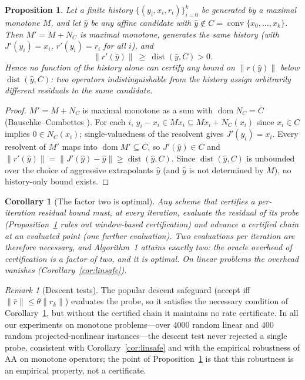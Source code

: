 \documentclass[11pt]{article}
\newtheorem{proposition}[theorem]{Proposition}
\newtheorem{corollary}[theorem]{Corollary}
\theoremstyle{definition}
\theoremstyle{remark}
\newtheorem{remark}[theorem]{Remark}
\DeclareMathOperator{\dom}{dom}
\DeclareMathOperator{\conv}{conv}
\DeclareMathOperator{\dist}{dist}
\newcommand{\norm}[1]{\| #1 \|}
\begin{document}
\begin{proposition}\label{prop:nohist}
Let a finite history $\{(y_i,x_i,r_i)\}_{i=0}^k$ be generated by a maximal
monotone $M$, and let $\hat y$ be any affine candidate with
$\hat y\notin C=\conv\{x_0,\dots,x_k\}$. Then
$M'=M+N_C$ is maximal monotone, generates the \emph{same} history
(with $J'(y_i)=x_i$, $r'(y_i)=r_i$ for all $i$), and
\[
\norm{r'(\hat y)}\ \ge\ \dist(\hat y,C)>0 .
\]
Hence no function of the history alone can certify any bound on
$\norm{r(\hat y)}$ below $\dist(\hat y,C)$: two operators indistinguishable
from the history assign arbitrarily different residuals to the same
candidate.
\end{proposition}
\begin{proof}
$M'=M+N_C$ is maximal monotone as a sum with $\dom N_C=\overline{C}$
(Bauschke--Combettes \cite[Cor.~25.5]{bauschke2017convex}). For each $i$,
$y_i-x_i\in Mx_i\subseteq Mx_i+N_C(x_i)$ since $x_i\in C$ implies
$0\in N_C(x_i)$; single-valuedness of the resolvent gives $J'(y_i)=x_i$.
Every resolvent of $M'$ maps into $\dom M'\subseteq C$, so
$J'(\hat y)\in C$ and
$\norm{r'(\hat y)}=\norm{J'(\hat y)-\hat y}\ge\dist(\hat y,C)$. Since
$\dist(\hat y,C)$ is unbounded over the choice of aggressive extrapolants
$\hat y$ (and $\hat y$ is not determined by $M$), no history-only bound
exists.
\end{proof}

\begin{corollary}[The factor two is optimal]\label{cor:optimal2}
Any scheme that certifies a per-iteration residual bound must, at every
iteration, evaluate the residual of its probe (Proposition~\ref{prop:nohist}
rules out window-based certification) and advance a certified chain at an
evaluated point (one further evaluation). Two evaluations per iteration are
therefore necessary, and Algorithm~1 attains exactly two: the oracle
overhead of certification is a factor of two, and it is optimal. On linear
problems the overhead vanishes (Corollary~\ref{cor:linsafe}).
\end{corollary}

\begin{remark}[Descent tests]\label{rem:zob}
The popular descent safeguard \cite{zhang2020globally} (accept iff
$\norm{\hat r}\le\theta\norm{r_k}$) evaluates the probe, so it satisfies
the necessary condition of Corollary~\ref{cor:optimal2}, but without the
certified chain it maintains no rate certificate. In all our experiments on
monotone problems---over $4000$ random linear and $400$ random
projected-nonlinear instances---the descent test never rejected a single
probe, consistent with Corollary~\ref{cor:linsafe} and with the empirical
robustness of AA on monotone operators; the point of
Proposition~\ref{prop:nohist} is that this robustness is an empirical
property, not a certificate.
\end{remark}
\end{document}
